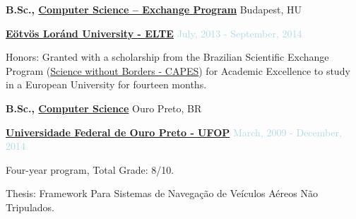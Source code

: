 \medskip

\textbf{B.Sc., 
        \href{https://www.elte.hu}
             {Computer Science -- Exchange Program}} \hfill Budapest, HU

\begin{outerlist}

\item[] \href{https://www.elte.hu}{\textbf{Eötvös Loránd University - ELTE}} \hfill {\textcolor{lightblue}{July, 2013 - September, 2014}} \medskip
        \begin{innerlist}[-]
        \item Honors: Granted with a scholarship from the Brazilian Scientific Exchange Program (\href{http://capes.gov.br/images/stories/download/diversos/folder-SWB.pdf}{Science without Borders - CAPES}) for Academic Excellence to study in a European University for fourteen months.
        \end{innerlist}

\end{outerlist}

\textbf{B.Sc., 
        \href{https://ufop.br}
             {Computer Science}} \hfill Ouro Preto, BR

\begin{outerlist}

\item[] \href{https://ufop.br}{\textbf{Universidade Federal de Ouro Preto - UFOP}} \hfill {\textcolor{lightblue}{March, 2009 - December, 2014}} \medskip
        \begin{innerlist}[-]
        \item Four-year program, Total Grade: 8/10.
        \item Thesis: Framework Para Sistemas de Navegação de Veículos Aéreos Não Tripulados.
        \end{innerlist}

\end{outerlist}

